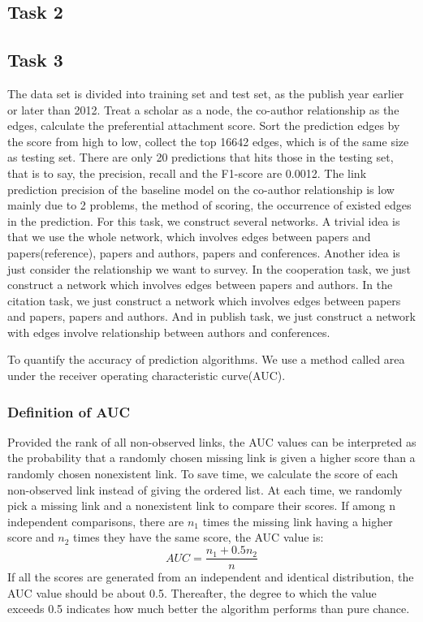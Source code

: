 \documentclass[conference]{IEEEtran}
\begin{document}
\subsection{Task 2}
\subsection{Task 3}
The data set is divided into training set and test set, as the publish year earlier or later than 2012. Treat a scholar as a node, the co-author relationship as the edges, calculate the preferential attachment score. Sort the prediction edges by the score from high to low, collect the top 16642 edges, which is of  the same size as testing set. There are only 20 predictions that hits those in the testing set, that is to say, the precision, recall and the F1-score are 0.0012. The link prediction precision of the baseline model on the co-author relationship is low mainly due to 2 problems, the method of scoring, the occurrence of existed edges in the prediction.
For this task, we construct several networks. A trivial idea is that we use the whole network, which involves edges between papers and papers(reference), papers and authors, papers and conferences. Another idea is just consider the relationship we want to survey. In the cooperation task, we just construct a network which involves edges between papers and authors. In the citation task, we just construct a network which involves edges between papers and papers, papers and authors. And in publish task, we just construct a network with edges involve relationship between authors and conferences.

To quantify the accuracy of prediction algorithms. We use a method called area under the receiver operating characteristic curve(AUC)\cite{lu2011link}. 
\subsubsection*{Definition of AUC}
Provided the rank of all non-observed links, the AUC values can be interpreted as the probability that a randomly chosen missing link is given a higher score than a randomly chosen nonexistent link. To save time, we calculate the score of each non-observed link instead of giving the ordered list. At each time, we randomly pick a missing link and a nonexistent link to compare their scores. If among n independent comparisons, there are $n_1$ times the missing link having a higher score and $n_2$ times they have the same score, the AUC value is:
\begin{equation}
AUC=\frac{n_1+0.5n_2}{n}
\end{equation}
If all the scores are generated from an independent and identical distribution, the AUC value should be about 0.5. Thereafter, the degree to which the value exceeds 0.5 indicates how much better the algorithm performs than pure chance.
\end{document}
